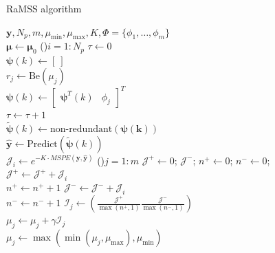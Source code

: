 \begin{algorithm}[H]
  \caption{RaMSS algorithm}\label{alg:RaMSS}
  $\bm{y},N_p,m,\mu_{\min},\mu_{\max},K,\Phi=\{\phi_{1},\dots,\phi_{m}\}$ \\
   {
     $ \bm{\mu} \gets \bm{\mu}_0$
     \For(){$i=1:N_p$}
      {
         $\tau \gets 0$ \\
         $\bm{\psi}(k) \gets [\ ]$  \\
         {
           $r_j \gets \text{Be}(\mu_j)$ \\
            {
            $\bm{\psi}(k) \gets \begin{bmatrix} \bm{\psi}^T(k) & \phi_j \end{bmatrix}^T $ \\
            $\tau \gets \tau + 1$ \\
            }
         }
         {
           $\tilde{\bm{\psi}}(k) \gets \text{non-redundant}(\bm{\psi(k)})$ \\
         }
         $\hat{\bm{y}} \gets \text{Predict}(\tilde{\bm{\psi}}(k))$ \\
         $\mathcal{J}_i \gets e^{-K\cdot MSPE(\bm{y},\bm{\hat{y}})} $
      }
      \For(){$j=1:m$}
      {
         $\mathcal{J}^{+} \gets 0$; $ \mathcal{J}^{-}$; $n^{+} \gets 0$; $n^{-} \gets 0$; \\
         {
            {
               $\mathcal{J}^{+} \gets \mathcal{J}^{+} + \mathcal{J}_i$ \\
               $n^{+} \gets n^{+} + 1$
            } \Else
            {
               $\mathcal{J}^{-} \gets \mathcal{J}^{-} + \mathcal{J}_i$ \\
               $n^{-} \gets n^{-} + 1$
            }
            $\mathcal{I}_j \gets \left( \frac{\mathcal{J}^{+}}{\max(n^+,1)} \frac{\mathcal{J}^{-}}{\max(n^-,1)} \right) $ \\
         $\mu_j \gets \mu_j + \gamma \mathcal{I}_j$ \\
         $\mu_j \gets \max \left( \min(\mu_j, \mu_{\max}), \mu_{\min} \right) $ \\
         }
      }
   }
\end{algorithm}%

